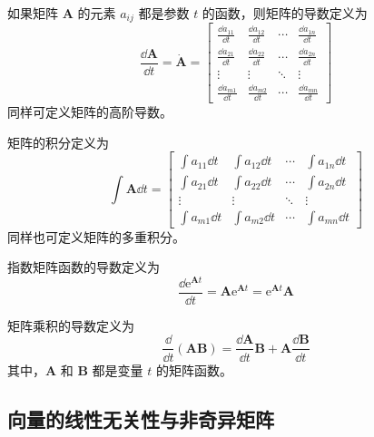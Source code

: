 \documentclass[punct=kaiming, fontset=fandol]{ctexbook}
\numberwithin{equation}{section}
\theoremstyle{mystyle}
\def\ee{\symup{e}}
\def\bf#1{\symbfit{#1}}
\def\ee{\mathrm{e}}
\def\bf#1{\bm{#1}}
\begin{document}
  如果矩阵 $\bf A$ 的元素 $a_{ij}$ 都是参数 $t$ 的函数，则矩阵的导数定义为
  \begin{equation}
    \frac{\dd{\bf A}}{\dd{t}} = \dot{\bf A} = \begin{bmatrix}
      \frac{\dd{a_{11}}}{\dd{t}} & \frac{\dd{a_{12}}}{\dd{t}} & \cdots & \frac{\dd{a_{1n}}}{\dd{t}} \\
      \frac{\dd{a_{21}}}{\dd{t}} & \frac{\dd{a_{22}}}{\dd{t}} & \cdots & \frac{\dd{a_{2n}}}{\dd{t}} \\
      \vdots & \vdots & \ddots & \vdots \\
      \frac{\dd{a_{m1}}}{\dd{t}} & \frac{\dd{a_{m2}}}{\dd{t}} & \cdots & \frac{\dd{a_{mn}}}{\dd{t}}
    \end{bmatrix}
  \end{equation}
  同样可定义矩阵的高阶导数。

  矩阵的积分定义为
  \begin{equation}
    \int \bf A \dd{t} = \begin{bmatrix}
      \int a_{11} \dd{t} & \int a_{12} \dd{t} & \cdots & \int a_{1n} \dd{t} \\
      \int a_{21} \dd{t} & \int a_{22} \dd{t} & \cdots & \int a_{2n} \dd{t} \\
      \vdots & \vdots & \ddots & \vdots \\
      \int a_{m1} \dd{t} & \int a_{m2} \dd{t} & \cdots & \int a_{mn} \dd{t}
    \end{bmatrix}
  \end{equation}
  同样也可定义矩阵的多重积分。

  指数矩阵函数的导数定义为
  \begin{equation}
    \frac{\dd{\ee^{\bf A t}}}{\dd{t}} = \bf A \ee^{\bf A t} = \ee^{\bf A t} \bf A
  \end{equation}

  矩阵乘积的导数定义为
  \begin{equation}
    \frac{\dd}{\dd{t}} (\bf A \bf B) = \frac{\dd{\bf A}}{\dd{t}} \bf B + \bf A \frac{\dd{\bf B}}{\dd{t}}
  \end{equation}
  其中，$\bf A$ 和 $\bf B$ 都是变量 $t$ 的矩阵函数。

  \subsection{向量的线性无关性与非奇异矩阵}
\end{document}
